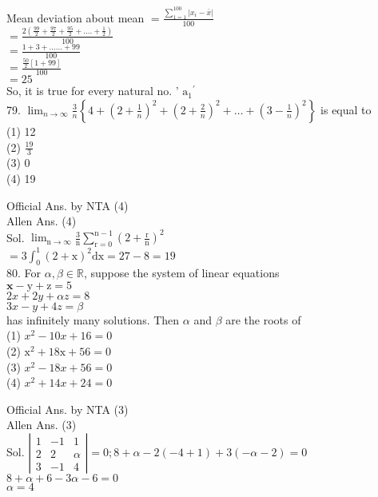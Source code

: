 \documentclass[10pt]{article}
\begin{document}
Mean deviation about mean \(=\frac{\sum_{1=1}^{100}\left|x_{i}-\bar{x}\right|}{100}\)\\
\(=\frac{2\left(\frac{99}{2}+\frac{97}{2}+\frac{95}{2}+\ldots .+\frac{1}{2}\right)}{100}\)\\
\(=\frac{1+3+\ldots \ldots+99}{100}\)\\
\(=\frac{\frac{50}{2}[1+99]}{100}\)\\
\(=25\)\\
So, it is true for every natural no. ' \(\mathrm{a}_{1}{ }^{\prime}\)\\
79. \(\lim _{n \rightarrow \infty} \frac{3}{n}\left\{4+\left(2+\frac{1}{n}\right)^{2}+\left(2+\frac{2}{n}\right)^{2}+\ldots+\left(3-\frac{1}{n}\right)^{2}\right\}\) is equal to\\
(1) 12\\
(2) \(\frac{19}{3}\)\\
(3) 0\\
(4) 19

Official Ans. by NTA (4)\\
Allen Ans. (4)\\
Sol. \(\lim _{\mathrm{n} \rightarrow \infty} \frac{3}{\mathrm{n}} \sum_{\mathrm{r}=0}^{\mathrm{n}-1}\left(2+\frac{\mathrm{r}}{\mathrm{n}}\right)^{2}\)\\
\(=3 \int_{0}^{1}(2+\mathrm{x})^{2} \mathrm{dx}=27-8=19\)\\
80. For \(\alpha, \beta \in \mathbb{R}\), suppose the system of linear equations\\
\(\mathbf{x}-\mathrm{y}+\mathrm{z}=5\)\\
\(2 x+2 y+\alpha z=8\)\\
\(3 x-y+4 z=\beta\)\\
has infinitely many solutions. Then \(\alpha\) and \(\beta\) are the roots of\\
(1) \(x^{2}-10 x+16=0\)\\
(2) \(\mathrm{x}^{2}+18 \mathrm{x}+56=0\)\\
(3) \(x^{2}-18 x+56=0\)\\
(4) \(x^{2}+14 x+24=0\)

Official Ans. by NTA (3)\\
Allen Ans. (3)\\
Sol. \(\left|\begin{array}{ccc}1 & -1 & 1 \\ 2 & 2 & \alpha \\ 3 & -1 & 4\end{array}\right|=0 ; 8+\alpha-2(-4+1)+3(-\alpha-2)=0\)\\
\(8+\alpha+6-3 \alpha-6=0\)\\
\(\alpha=4\)
\end{document}
